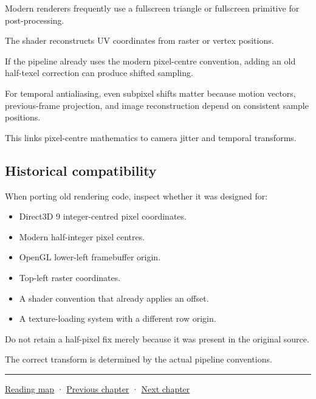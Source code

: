 Modern renderers frequently use a fullscreen triangle or fullscreen primitive for post-processing.

The shader reconstructs UV coordinates from raster or vertex positions.

If the pipeline already uses the modern pixel-centre convention, adding an old half-texel correction can produce shifted sampling.

For temporal antialiasing, even subpixel shifts matter because motion vectors, previous-frame projection, and image reconstruction depend on consistent sample positions.

This links pixel-centre mathematics to camera jitter and temporal transforms.

\subsection{Historical compatibility}\label{02-foundations-ii-ch033-historical-compatibility}

When porting old rendering code, inspect whether it was designed for:

\begin{itemize}
\tightlist
\item
  Direct3D 9 integer-centred pixel coordinates.
\item
  Modern half-integer pixel centres.
\item
  OpenGL lower-left framebuffer origin.
\item
  Top-left raster coordinates.
\item
  A shader convention that already applies an offset.
\item
  A texture-loading system with a different row origin.
\end{itemize}

Do not retain a half-pixel fix merely because it was present in the original source.

The correct transform is determined by the actual pipeline conventions.

\begin{center}\rule{0.5\linewidth}{0.5pt}\end{center}

\hyperref[volume-reading-map]{Reading map} · \hyperref[02-foundations-ii-ch032-geometry-becomes-an-image-and-an-inverse-problem]{Previous chapter} · \hyperref[02-foundations-ii-ch034-robust-predicates-and-camera-sensitivity]{Next chapter}

